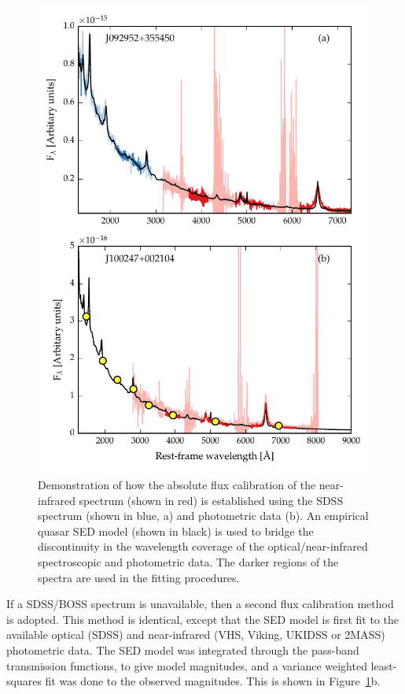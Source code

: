 \begin{figure}
    \centering
    \includegraphics[width=\textwidth]{figures/chapter02/normalise_to_sdss.pdf} 
    \caption[{}]{Demonstration of how the absolute flux calibration of the near-infrared spectrum (shown in red) is established using the SDSS spectrum (shown in blue, a) and photometric data (b). An empirical quasar SED model (shown in black) is used to bridge the discontinuity in the wavelength coverage of the optical/near-infrared spectroscopic and photometric data. The darker regions of the spectra are used in the fitting procedures.}     
    \label{fig:normalise_to_sdss}
\end{figure}

If a SDSS/BOSS spectrum is unavailable, then a second flux calibration method is adopted. 
This method is identical, except that the SED model is first fit to the available optical (SDSS) and near-infrared (VHS, Viking, UKIDSS or 2MASS) photometric data. 
The SED model was integrated through the pass-band transmission functions, to give model magnitudes, and a variance weighted least-squares fit was done to the observed magnitudes. 
This is shown in Figure~\ref{fig:normalise_to_sdss}b. 

